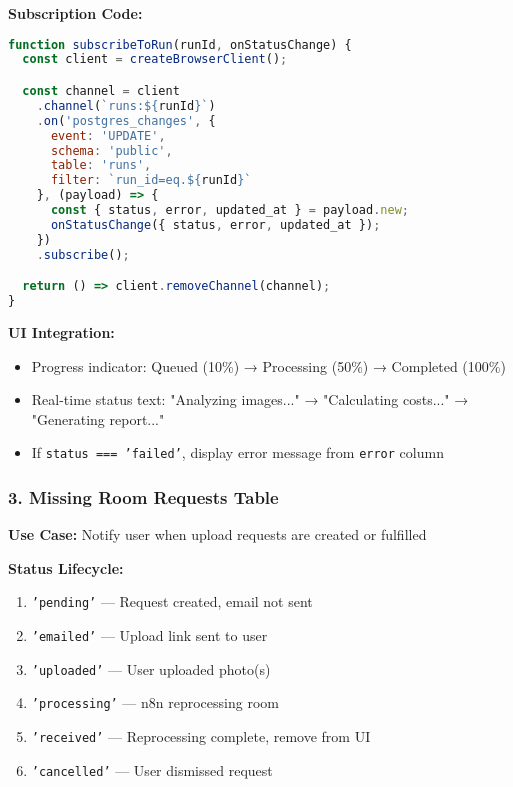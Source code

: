 \documentclass[11pt,a4paper]{article}
\begin{document}
\textbf{Subscription Code:}
\begin{lstlisting}[language=JavaScript, caption=Run Status Subscription]
function subscribeToRun(runId, onStatusChange) {
  const client = createBrowserClient();

  const channel = client
    .channel(`runs:${runId}`)
    .on('postgres_changes', {
      event: 'UPDATE',
      schema: 'public',
      table: 'runs',
      filter: `run_id=eq.${runId}`
    }, (payload) => {
      const { status, error, updated_at } = payload.new;
      onStatusChange({ status, error, updated_at });
    })
    .subscribe();

  return () => client.removeChannel(channel);
}
\end{lstlisting}

\textbf{UI Integration:}
\begin{itemize}
  \item Progress indicator: Queued (10\%) → Processing (50\%) → Completed (100\%)
  \item Real-time status text: "Analyzing images..." → "Calculating costs..." → "Generating report..."
  \item If \texttt{status === 'failed'}, display error message from \texttt{error} column
\end{itemize}

\subsubsection{3. Missing Room Requests Table}

\textbf{Use Case:} Notify user when upload requests are created or fulfilled

\textbf{Status Lifecycle:}
\begin{enumerate}
  \item \texttt{'pending'} — Request created, email not sent
  \item \texttt{'emailed'} — Upload link sent to user
  \item \texttt{'uploaded'} — User uploaded photo(s)
  \item \texttt{'processing'} — n8n reprocessing room
  \item \texttt{'received'} — Reprocessing complete, remove from UI
  \item \texttt{'cancelled'} — User dismissed request
\end{enumerate}
\end{document}
